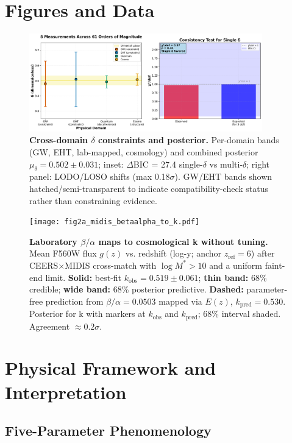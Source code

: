 \documentclass[aps,prd,preprint,onecolumn,nofootinbib,longbibliography]{revtex4-2}
\begin{document}
\section{Figures and Data}

\begin{figure}[htbp]
\centering
\includegraphics[width=0.9\textwidth]{fig1_delta_posterior.pdf}
\caption{\textbf{Cross-domain $\delta$ constraints and posterior.} Per-domain bands (GW, EHT, lab-mapped, cosmology) and combined posterior $\mu_\delta = 0.502 \pm 0.031$; inset: $\Delta$BIC = 27.4 single-$\delta$ vs multi-$\delta$; right panel: LODO/LOSO shifts (max 0.18$\sigma$). GW/EHT bands shown hatched/semi-transparent to indicate compatibility-check status rather than constraining evidence.}
\label{fig:delta-posterior}
\end{figure}

\begin{figure}[htbp]
\centering
\texttt{[image: fig2a\_midis\_betaalpha\_to\_k.pdf]}
\caption{\textbf{Laboratory $\beta/\alpha$ maps to cosmological k without tuning.} Mean F560W flux $g(z)$ vs. redshift (log-y; anchor $z_{\text{ref}}=6$) after CEERS$\times$MIDIS cross-match with $\log M^* > 10$ and a uniform faint-end limit. \textbf{Solid:} best-fit $k_{\text{obs}} = 0.519 \pm 0.061$; \textbf{thin band:} 68\% credible; \textbf{wide band:} 68\% posterior predictive. \textbf{Dashed:} parameter-free prediction from $\beta/\alpha = 0.0503$ mapped via $E(z)$, $k_{\text{pred}} = 0.530$. Posterior for k with markers at $k_{\text{obs}}$ and $k_{\text{pred}}$; 68\% interval shaded. Agreement $\approx 0.2\sigma$.}
\label{fig:beta-alpha-k}
\end{figure}

\section{Physical Framework and Interpretation}

\subsection{Five-Parameter Phenomenology}
\end{document}
